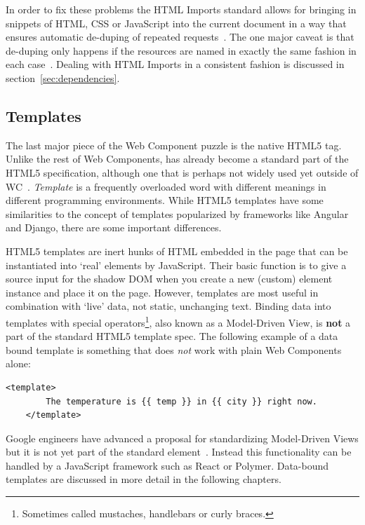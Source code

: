 In order to fix these problems the HTML Imports standard allows for bringing in snippets of HTML, CSS or JavaScript into the current document in a way that ensures automatic de-duping of repeated requests~\cite{w3ccontributors2015-a}.
The one major caveat is that de-duping only happens if the resources are named in exactly the same fashion in each case~\cite{bidelman2013}.
Dealing with HTML Imports in a consistent fashion is discussed in section~\ref{sec:dependencies}.

\subsection{Templates}
The last major piece of the Web Component puzzle is the native HTML5  tag. 
Unlike the rest of Web Components,  has already become a standard part of the HTML5 specification, 
although one that is perhaps not widely used yet outside of WC~\cite{w3ccontributors2015-c}.
\textit{Template} is a frequently overloaded word with different meanings in different programming environments.
While HTML5 templates have some similarities to the concept of templates popularized by frameworks like Angular and Django, there are some important differences.

HTML5 templates are inert hunks of HTML embedded in the page that can be instantiated into `real' elements by JavaScript.
Their basic function is to give a source input for the shadow DOM when you create a new (custom) element instance and place it on the page.
However, templates are most useful in combination with `live' data, not static, unchanging text.
Binding data into templates with special operators\footnote{
Sometimes called mustaches, handlebars or curly braces. },
also known as a Model-Driven View,
is \textbf{not} a part of the standard HTML5 template spec.
The following example of a data bound template is something that does \textit{not} work with plain Web Components alone:

\begin{lstlisting}[language=HTML5,caption={An example of a data-bound template.},label=l:dbtemplate]
	<template> 
		The temperature is {{ temp }} in {{ city }} right now.
	</template>
\end{lstlisting}

Google engineers have advanced a proposal for standardizing 
Model-Driven Views
but it is not yet part of the standard  element~\cite{googledevelopers2014}.
Instead this functionality can be handled by a JavaScript framework such as React or Polymer.
Data-bound templates are discussed in more detail in the following chapters.

